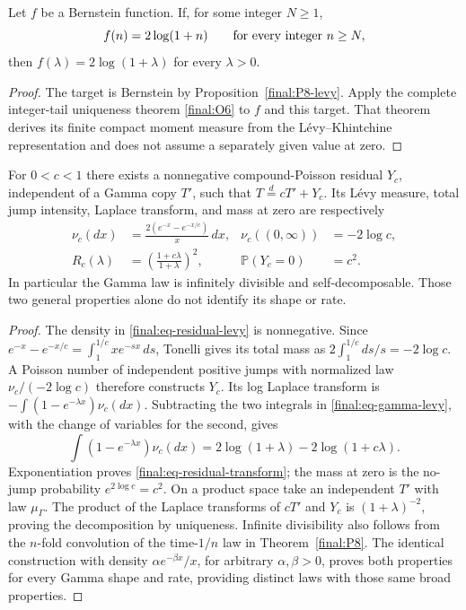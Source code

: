 \begin{corollary}
\label{final:P8-samples}
Let $f$ be a Bernstein function.  If, for some integer $N\geq1$,
\[
 f(n)=2\log(1+n)\qquad\hbox{for every integer }n\geq N,
\]
then $f(\lambda)=2\log(1+\lambda)$ for every $\lambda>0$.
\end{corollary}
\begin{proof}
The target is Bernstein by Proposition~\ref{final:P8-levy}.
Apply the complete integer-tail uniqueness theorem
\ref{final:O6} to $f$ and this target.  That theorem derives its
finite compact moment measure from the L\'evy--Khintchine
representation and does not assume a separately given value at zero.
\end{proof}

\begin{proposition}
\label{final:P8-selfdecomposition}
For $0<c<1$ there exists a nonnegative compound-Poisson residual
$Y_c$, independent of a Gamma copy $T'$, such that
$T\stackrel{d}{=}cT'+Y_c$.  Its L\'evy measure, total jump intensity,
Laplace transform, and mass at zero are respectively
\begin{align}
 \nu_c(dx)&=\frac{2(e^{-x}-e^{-x/c})}{x}\,dx,
 &\nu_c((0,\infty))&=-2\log c,\label{final:eq-residual-levy}\\
 R_c(\lambda)&=\left(\frac{1+c\lambda}{1+\lambda}\right)^2,
 &\mathbb P(Y_c=0)&=c^2.\label{final:eq-residual-transform}
\end{align}
In particular the Gamma law is infinitely divisible and
self-decomposable.  Those two general properties alone do not
identify its shape or rate.
\end{proposition}
\begin{proof}
The density in \eqref{final:eq-residual-levy} is nonnegative.
Since
$e^{-x}-e^{-x/c}=\int_1^{1/c}x e^{-sx}\,ds$, Tonelli gives its
total mass as $2\int_1^{1/c}ds/s=-2\log c$.
A Poisson number of independent positive jumps with normalized law
$\nu_c/(-2\log c)$ therefore constructs $Y_c$.  Its log Laplace
transform is $-\int(1-e^{-\lambda x})\nu_c(dx)$.
Subtracting the two integrals in \eqref{final:eq-gamma-levy}, with
the change of variables for the second, gives
\[
 \int(1-e^{-\lambda x})\nu_c(dx)
 =2\log(1+\lambda)-2\log(1+c\lambda).
\]
Exponentiation proves \eqref{final:eq-residual-transform}; the
mass at zero is the no-jump probability $e^{2\log c}=c^2$.
On a product space take an independent $T'$ with law $\mu_\Gamma$.
The product of the Laplace transforms of $cT'$ and $Y_c$ is
$(1+\lambda)^{-2}$, proving the decomposition by uniqueness.
Infinite divisibility also follows from the $n$-fold convolution
of the time-$1/n$ law in Theorem~\ref{final:P8}.
The identical construction with density
$\alpha e^{-\beta x}/x$, for arbitrary $\alpha,\beta>0$,
proves both properties for every Gamma shape and rate, providing
distinct laws with those same broad properties.
\end{proof}

